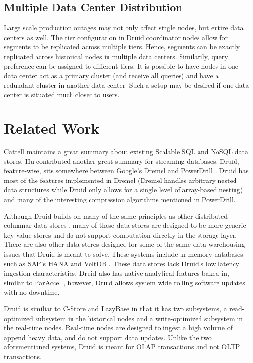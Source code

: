 \documentclass{sig-alternate-2013}
\begin{document}
\subsection{Multiple Data Center Distribution}
Large scale production outages may not only affect single nodes, but entire
data centers as well. The tier configuration in Druid coordinator nodes allow
for segments to be replicated across multiple tiers. Hence, segments can be
exactly replicated across historical nodes in multiple data centers.
Similarily, query preference can be assigned to different tiers. It is possible
to have nodes in one data center act as a primary cluster (and receive all
queries) and have a redundant cluster in another data center. Such a setup may
be desired if one data center is situated much closer to users.

\section{Related Work}
\label{sec:related}
Cattell \cite{cattell2011scalable} maintains a great summary about existing
Scalable SQL and NoSQL data stores. Hu \cite{hu2011stream} contributed another
great summary for streaming databases. Druid, feature-wise, sits somewhere
between Google’s Dremel \cite{melnik2010dremel} and PowerDrill
\cite{hall2012processing}. Druid has most of the features implemented in Dremel
(Dremel handles arbitrary nested data structures while Druid only allows for a
single level of array-based nesting) and many of the interesting compression
algorithms mentioned in PowerDrill.

Although Druid builds on many of the same principles as other distributed
columnar data stores \cite{fink2012distributed}, many of these data stores are
designed to be more generic key-value stores \cite{lakshman2010cassandra} and do not
support computation directly in the storage layer. There are also other data
stores designed for some of the same data warehousing issues that Druid
is meant to solve. These systems include in-memory databases such as
SAP’s HANA \cite{farber2012sap} and VoltDB \cite{voltdb2010voltdb}. These data
stores lack Druid's low latency ingestion characteristics. Druid also has
native analytical features baked in, similar to ParAccel \cite{paraccel2013}, however,
Druid allows system wide rolling software updates with no downtime.

Druid is similiar to C-Store \cite{stonebraker2005c} and LazyBase \cite{cipar2012lazybase} in that it has
two subsystems, a read-optimized subsystem in the historical nodes and a
write-optimized subsystem in the real-time nodes. Real-time nodes are designed to
ingest a high volume of append heavy data, and do not support data updates.
Unlike the two aforementioned systems, Druid is meant for OLAP transactions and
not OLTP transactions.
\end{document}
